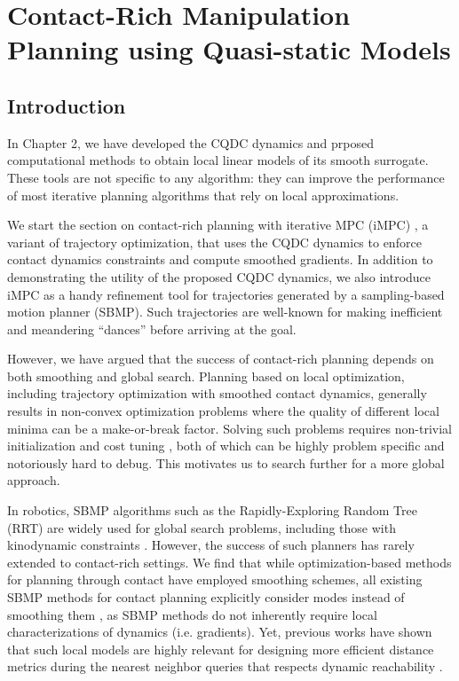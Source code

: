\chapter{Contact-Rich Manipulation Planning using Quasi-static Models} \label{chapter:contact_rich_planning}
\section{Introduction}
In Chapter 2, we have developed the CQDC dynamics and prposed computational methods to obtain local linear models of its smooth surrogate. These tools are not specific to any algorithm: they can improve the performance of most iterative planning algorithms that rely on local approximations. 

We start the section on contact-rich planning with iterative MPC (iMPC) \cite{bundledgradients}, a variant of trajectory optimization, that uses the CQDC dynamics to enforce contact dynamics constraints and compute smoothed gradients. In addition to demonstrating the utility of the proposed CQDC dynamics, we also introduce iMPC as a handy refinement tool for trajectories generated by a sampling-based motion planner (SBMP). Such trajectories are well-known for making inefficient and meandering ``dances'' before arriving at the goal. 

However, we have argued that the success of contact-rich planning depends on both smoothing and global search. Planning based on local optimization, including trajectory optimization with smoothed contact dynamics, generally results in non-convex optimization problems where the quality of different local minima can be a make-or-break factor. Solving such problems requires non-trivial initialization and cost tuning \cite{onol2020tuning}, both of which can be highly problem specific and notoriously hard to debug. This motivates us to search further for a more global approach.

In robotics, SBMP algorithms such as the Rapidly-Exploring Random Tree (RRT) \cite{lavalle1998rapidly} are widely used for global search problems, including those with kinodynamic constraints \cite{karaman2010optimal}. However, the success of such planners has rarely extended to contact-rich settings. We find that while optimization-based methods for planning through contact have employed smoothing schemes, all existing SBMP methods for contact planning explicitly consider modes instead of smoothing them \cite{cheng2021contact,wu2020r3t,chen2021trajectotree,motioncones,terry}, as SBMP methods do not inherently require local characterizations of dynamics (i.e. gradients). Yet, previous works have shown that such local models are highly relevant for designing more efficient distance metrics during the nearest neighbor queries that respects dynamic reachability \cite{shkolnik2009reachability,wu2020r3t,haddad2021anytime}.

